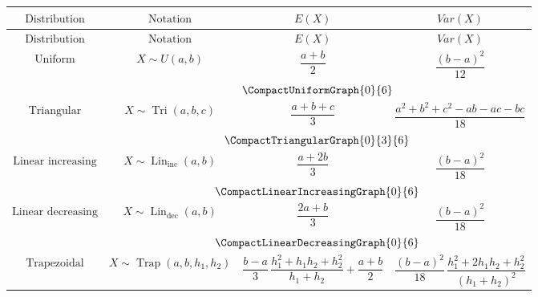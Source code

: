 	{
		\renewcommand{\arraystretch}{1.9}
		
		\begin{longtable}{c|c|c|c}
			$\text{Distribution}$
			&
			$\text{Notation}$
			&
			$E(X)$
			&
			$Var(X)$
			\\[1mm]
			\hline
			\endfirsthead
			
			$\text{Distribution}$
			&
			$\text{Notation}$
			&
			$E(X)$
			&
			$Var(X)$
			\\[1mm]
			\hline
			\endhead
			
			\hline
			\endfoot
			
			$\text{Uniform}$
			&
			$X\sim U(a,b)$
			&
			$\dfrac{a+b}{2}$
			&
			$\dfrac{(b-a)^2}{12}$
			\\[2mm]
			
			&
			\multicolumn{3}{c}{
				$\vcenter{\hbox{\CompactUniformGraph{0}{6}}}$
			}
			\\[5mm]
			\hline
			
			$\text{Triangular}$
			&
			$X\sim \operatorname{Tri}(a,b,c)$
			&
			$\dfrac{a+b+c}{3}$
			&
			$\dfrac{a^2+b^2+c^2-ab-ac-bc}{18}$
			\\[2mm]
			
			&
			\multicolumn{3}{c}{
				$\vcenter{\hbox{\CompactTriangularGraph{0}{3}{6}}}$
			}
			\\[5mm]
			\hline
			
			$\text{Linear increasing}$
			&
			$X\sim \operatorname{Lin}_{\mathrm{inc}}(a,b)$
			&
			$\dfrac{a+2b}{3}$
			&
			$\dfrac{(b-a)^2}{18}$
			\\[2mm]
			
			&
			\multicolumn{3}{c}{
				$\vcenter{\hbox{\CompactLinearIncreasingGraph{0}{6}}}$
			}
			\\[5mm]
			\hline
			
			$\text{Linear decreasing}$
			&
			$X\sim \operatorname{Lin}_{\mathrm{dec}}(a,b)$
			&
			$\dfrac{2a+b}{3}$
			&
			$\dfrac{(b-a)^2}{18}$
			\\[2mm]
			
			&
			\multicolumn{3}{c}{
				$\vcenter{\hbox{\CompactLinearDecreasingGraph{0}{6}}}$
			}
			\\[5mm]
			\hline
			
			\newpage
			
			$\text{Trapezoidal}$
			&
			$X\sim \operatorname{Trap}(a,b,h_1,h_2)$
			&
			$\dfrac{b-a}{3}\,
			\dfrac{h_1^2+h_1h_2+h_2^2}{h_1+h_2}
			+\dfrac{a+b}{2}$
			&
			$\dfrac{(b-a)^2}{18}\,
			\dfrac{h_1^2+2h_1h_2+h_2^2}{(h_1+h_2)^2}$
			\\[2mm]
			

\end{longtable}}
